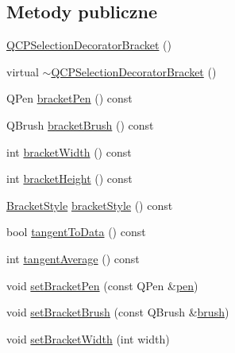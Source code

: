 \subsection*{Metody publiczne}
\begin{DoxyCompactItemize}
\item 
\hyperlink{class_q_c_p_selection_decorator_bracket_ad2cfbff98cc055311810ba357f6eef1b}{Q\+C\+P\+Selection\+Decorator\+Bracket} ()
\item 
virtual \hyperlink{class_q_c_p_selection_decorator_bracket_add2764b01a029c64f08f34f08ea6d41b}{$\sim$\+Q\+C\+P\+Selection\+Decorator\+Bracket} ()
\item 
Q\+Pen \hyperlink{class_q_c_p_selection_decorator_bracket_a005e0b95ead06dee20898ea925b31474}{bracket\+Pen} () const 
\item 
Q\+Brush \hyperlink{class_q_c_p_selection_decorator_bracket_a09805c4d1db2c5d0fcaf22e9e1e25a7c}{bracket\+Brush} () const 
\item 
int \hyperlink{class_q_c_p_selection_decorator_bracket_a96e958e7a9caf3eef7722790ebd60e4d}{bracket\+Width} () const 
\item 
int \hyperlink{class_q_c_p_selection_decorator_bracket_a79045907e7387b2555e0a166190b26b7}{bracket\+Height} () const 
\item 
\hyperlink{class_q_c_p_selection_decorator_bracket_aa6d18517ec0553575bbef0de4252336e}{Bracket\+Style} \hyperlink{class_q_c_p_selection_decorator_bracket_a749cd77f4e01a3aa8ecdfea0792e181b}{bracket\+Style} () const 
\item 
bool \hyperlink{class_q_c_p_selection_decorator_bracket_a3e443e880f0bac1580eb07a0889d7891}{tangent\+To\+Data} () const 
\item 
int \hyperlink{class_q_c_p_selection_decorator_bracket_a53bc3c7d6c5f59d1f893c22eabd215cf}{tangent\+Average} () const 
\item 
void \hyperlink{class_q_c_p_selection_decorator_bracket_ac0e392a6097990f8aa978932a8fa05d6}{set\+Bracket\+Pen} (const Q\+Pen \&\hyperlink{class_q_c_p_selection_decorator_a8365eaa0543756dd6758efa32fbe8041}{pen})
\item 
void \hyperlink{class_q_c_p_selection_decorator_bracket_a2f4ea0bfb0ea980252b76dd349dd53aa}{set\+Bracket\+Brush} (const Q\+Brush \&\hyperlink{class_q_c_p_selection_decorator_a661b4703ebd3115dc4b07810dd148b20}{brush})
\item 
void \hyperlink{class_q_c_p_selection_decorator_bracket_a291b59cab98ce93a0a3c85963fe10f5e}{set\+Bracket\+Width} (int width)
\item 

\end{DoxyCompactItemize}
